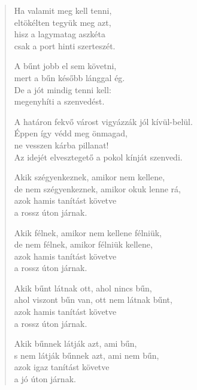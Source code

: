 \begin{verse}
 Ha valamit meg kell tenni,\\
eltökélten tegyük meg azt,\\
hisz a lagymatag aszkéta\\
csak a port hinti szerteszét.

 A bűnt jobb el sem követni,\\
mert a bűn később lánggal ég.\\
De a jót mindig tenni kell:\\
megenyhíti a szenvedést.

 A határon fekvő várost vigyázzák jól kívül-belül.\\
Éppen így védd meg önmagad,\\
ne vesszen kárba pillanat!\\
Az idejét elvesztegető a pokol kínját szenvedi.

 Akik szégyenkeznek, amikor nem kellene,\\
de nem szégyenkeznek, amikor okuk lenne rá,\\
azok hamis tanítást követve\\
a rossz úton járnak.

 Akik félnek, amikor nem kellene félniük,\\
de nem félnek, amikor félniük kellene,\\
azok hamis tanítást követve\\
a rossz úton járnak.

 Akik bűnt látnak ott, ahol nincs bűn,\\
ahol viszont bűn van, ott nem látnak bűnt,\\
azok hamis tanítást követve\\
a rossz úton járnak.

 Akik bűnnek látják azt, ami bűn,\\
s nem látják bűnnek azt, ami nem bűn,\\
azok igaz tanítást követve\\
a jó úton járnak.

\end{verse}
